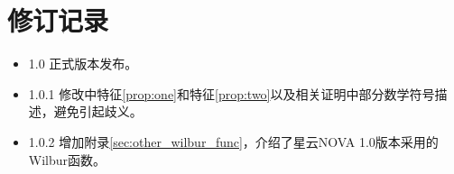 \section{修订记录}
\begin{itemize}
\item{1.0} 正式版本发布。
\item{1.0.1} 修改中特征\ref{prop:one}和特征\ref{prop:two}以及相关证明中部分数学符号描述，避免引起歧义。
\item{1.0.2} 增加附录\ref{sec:other_wilbur_func}，介绍了星云NOVA 1.0版本采用的Wilbur函数。
\end{itemize}
